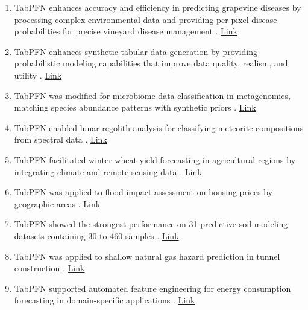 \begin{enumerate}
\item TabPFN enhances accuracy and efficiency in predicting grapevine diseases by processing complex environmental data and providing per-pixel disease probabilities for precise vineyard disease management \cite{zhao2024grapevinediseasepredictionusing}. \href{http://arxiv.org/abs/2406.07094v1}{Link}

\item TabPFN enhances synthetic tabular data generation by providing probabilistic modeling capabilities that improve data quality, realism, and utility \cite{githubGitHubSebhaanTabPFGen}. \href{https://github.com/sebhaan/TabPFGen}{Link}

\item TabPFN was modified for microbiome data classification in metagenomics, matching species abundance patterns with synthetic priors \cite{other_usecase1_microbiome_zero_inflated}. \href{https://openreview.net/forum?id=3I0bVvUj25}{Link}

\item TabPFN enabled lunar regolith analysis for classifying meteorite compositions from spectral data \cite{other_usecase2_lunar_meteorites}. \href{https://www.sciencedirect.com/science/article/pii/S2095268624001010}{Link}

\item TabPFN facilitated winter wheat yield forecasting in agricultural regions by integrating climate and remote sensing data \cite{other_usecase3_winter_wheat_yield_ssrn}. \href{https://papers.ssrn.com/sol3/papers.cfm?abstract_id=5380177}{Link}

\item TabPFN was applied to flood impact assessment on housing prices by geographic areas \cite{other_usecase4_flood_housing_prices_ml_climate}. \href{https://github.com/melina-thegarza/ml-climate/blob/main/doc/ML_Climate___Final.pdf}{Link}

\item TabPFN showed the strongest performance on 31 predictive soil modeling datasets containing 30 to 460 samples \cite{other_usecase5_soil_mapping_new_default}. \href{https://arxiv.org/abs/2508.09888}{Link}

\item TabPFN was applied to shallow natural gas hazard prediction in tunnel construction \cite{other_usecase6_shallow_gas_tunnel_tabpfn}. \href{https://www.sciencedirect.com/science/article/pii/S2590123025029366}{Link}

\item TabPFN supported automated feature engineering for energy consumption forecasting in domain-specific applications \cite{other_usecase7_autoenergy_feature_eng}. \href{https://www.sciencedirect.com/science/article/pii/S0950705125013413}{Link}


\end{enumerate}
